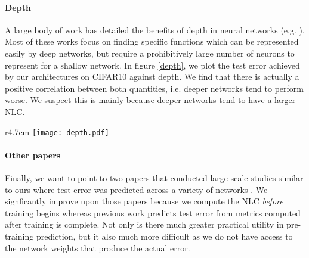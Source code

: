 \documentclass{article} %
\begin{document}

\paragraph{Depth} A large body of work has detailed the benefits of depth in neural networks (e.g. \citet{depth1,depth2,depth3,depth4,depth5,depth6,depth7}). Most of these works focus on finding specific functions which can be represented easily by deep networks, but require a prohibitively large number of neurons to represent for a shallow network. In figure \ref{depth}, we plot the test error achieved by our architectures on CIFAR10 against depth. We find that there is actually a positive correlation between both quantities, i.e. deeper networks tend to perform worse. We suspect this is mainly because deeper networks tend to have a larger NLC. 

\begin{wrapfigure}{r}{4.7cm}
\texttt{[image: depth.pdf]}
\caption{Depth versus test error.}\label{depth}
\end{wrapfigure} 



\paragraph{Other papers} Finally, we want to point to two papers that conducted large-scale studies similar to ours where test error was predicted across a variety of networks \citep{explosionGeneralization,marginPrediction}. We signficantly improve upon those papers because we compute the NLC {\it before} training begins whereas previous work predicts test error from metrics computed after training is complete. Not only is there much greater practical utility in pre-training prediction, but it also much more difficult as we do not have access to the network weights that produce the actual error.
\end{document}
